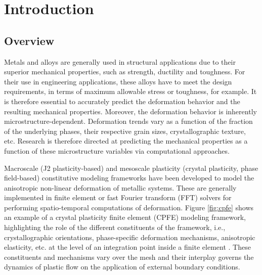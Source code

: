 
\chapter{Introduction} %

\label{Chapter1} %



\section{Overview}

\label{sec:overview}

Metals and alloys are generally used in structural applications due to their superior mechanical properties, such as strength, ductility and toughness. For their use in engineering applications, these alloys have to meet the design requirements, in terms of maximum allowable stress or toughness, for example. It is therefore essential to accurately predict the deformation behavior and the resulting mechanical properties. Moreover, the deformation behavior is inherently microstructure-dependent. Deformation trends vary as a function of the fraction of the underlying phases, their respective grain sizes, crystallographic texture, etc. Research is therefore directed at predicting the mechanical properties as a function of these microstructure variables via computational approaches.

Macroscale (J2 plasticity-based) and mesoscale plasticity (crystal plasticity, phase field-based) constitutive modeling frameworks have been developed to model the anisotropic non-linear deformation of metallic systems. These are generally implemented in finite element \cite{ROTERS20101152} \cite{MAYEUR20071457}  \cite{DAWSON2000115} or fast Fourier transform (FFT) solvers \cite{Liu_2010} \cite{LEBENSOHN201259} for performing spatio-temporal computations of deformation. Figure \ref{fig:cpfe} shows an example of a crystal plasticity finite element (CPFE) modeling framework, highlighting the role of the different constituents of the framework, i.e., crystallographic orientations, phase-specific deformation mechanisms, anisotropic elasticity, etc. at the level of an integration point inside a finite element \cite{ROTERS20101152}. These constituents and mechanisms vary over the mesh and their interplay governs the dynamics of plastic flow on the application of external boundary conditions. 

